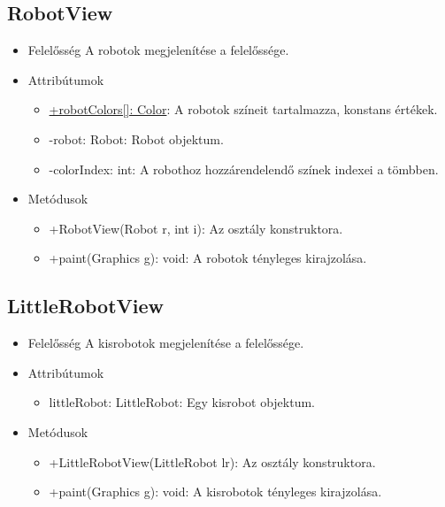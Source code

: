 \subsection{RobotView}
\begin{itemize}
	\item Felelősség\newline
	A robotok megjelenítése a felelőssége.
	
	\item Attribútumok\newline
	\begin{itemize}
		\item \underline{+robotColors[]: Color}: A robotok színeit tartalmazza, konstans értékek. 
		\item -robot: Robot: Robot objektum.
		\item -colorIndex: int: A robothoz hozzárendelendő színek indexei a tömbben.
	\end{itemize}
	\item Metódusok\newline
	\begin{itemize}
		\item +RobotView(Robot r, int i): Az osztály konstruktora.
		\item +paint(Graphics g): void: A robotok tényleges kirajzolása.
	\end{itemize}
\end{itemize}

\subsection{LittleRobotView}
\begin{itemize}
	\item Felelősség\newline
	A kisrobotok megjelenítése a felelőssége.

	\item Attribútumok\newline
	\begin{itemize}
		\item littleRobot: LittleRobot: Egy kisrobot objektum.
		
	\end{itemize}
	\item Metódusok\newline
	\begin{itemize}
		\item +LittleRobotView(LittleRobot lr): Az osztály konstruktora.
		\item +paint(Graphics g): void: A kisrobotok tényleges kirajzolása.
	\end{itemize}
\end{itemize}

